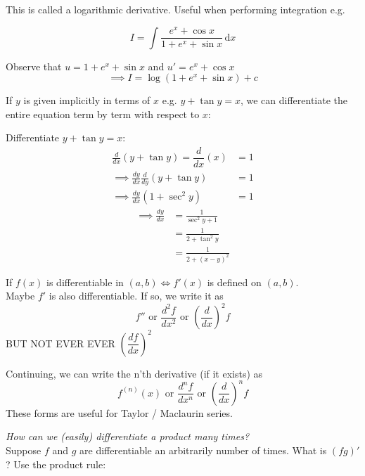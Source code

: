 \documentclass[twoside]{scrartcl}
\begin{document}
This is called a logarithmic derivative. Useful when performing integration e.g.

\[\displaystyle{
I = \int \frac{e^x + \cos x}{1 + e^x + \sin x} \, \mathrm{d}x
}\]

Observe that $u = 1 + e^x + \sin x$ and $u' = e^x + \cos x$
\[\implies I = \log(1 + e^x + \sin x) + c\]


If $y$ is given implicitly in terms of $x$ e.g. $y + \tan y = x$, we can differentiate the entire equation term by term with respect to $x$:\\

\begin{example}
Differentiate $y + \tan y = x$:
\begin{align*}\nonumber
\frac{d}{dx}(y + \tan y) = \dfrac{d}{dx}(x) &= 1
\\ \nonumber 
\implies \frac{dy}{dx}\frac{d}{dy}(y + \tan y) &= 1
\\ \nonumber
\implies \frac{dy}{dx}(1 + \sec^2y) &= 1
\end{align*}
\begin{align*}
\implies \frac{dy}{dx} &= \frac{1}{\sec^2y + 1}\\
& = \frac{1}{2 + \tan^2y}\\
& = \frac{1}{2 + (x-y)^2}
\end{align*}
\end{example}




If $f(x)$ is differentiable in $(a,b) \iff f'(x)$ is defined on $(a,b)$.\\

 Maybe $f'$ is also differentiable. If so, we write it as 
 \[f''\text{ or }\dfrac{d^2f}{dx^2}\text{ or }\left(\dfrac{d}{dx}\right)^2f\]
 BUT NOT EVER EVER $\left(\dfrac{df}{dx}\right)^2$
 
 Continuing, we can write the n'th derivative (if it exists) as 
 \[f^{(n)}(x)\text{ or  }\dfrac{d^nf}{dx^n}\text{ or }\left(\dfrac{d}{dx}\right)^n f\]
 These forms are useful for Taylor / Maclaurin series.


\textit{How can we (easily) differentiate a product many times?} \\

Suppose $f$ and $g$ are differentiable an arbitrarily number of times. What is $(fg)'$? Use the product rule:
\end{document}
